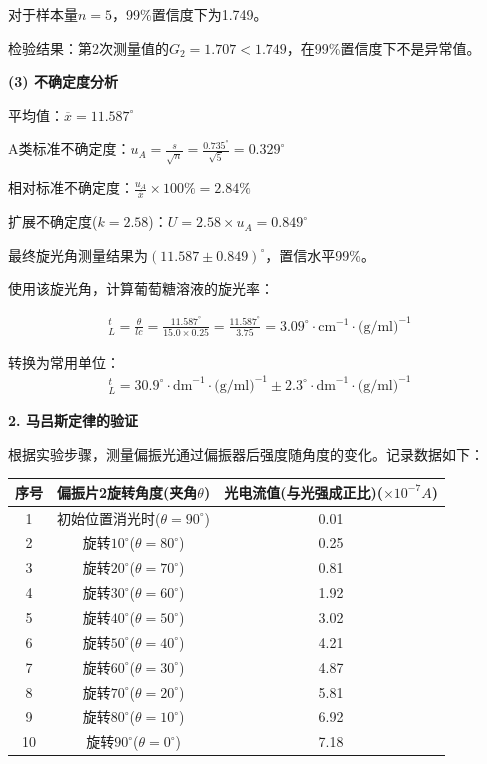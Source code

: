 ﻿\documentclass[12pt,a4paper]{article}
\begin{document}
对于样本量$n=5$，99\%置信度下为1.749。

检验结果：第2次测量值的$G_2 = 1.707 < 1.749$，在99\%置信度下不是异常值。

\textbf{(3) 不确定度分析}

平均值：$\overline{x} = 11.587^\circ$

A类标准不确定度：$u_A = \frac{s}{\sqrt{n}} = \frac{0.735^\circ}{\sqrt{5}} = 0.329^\circ$

相对标准不确定度：$\frac{u_A}{\overline{x}} \times 100\% = 2.84\%$

扩展不确定度($k=2.58$)：$U = 2.58 \times u_A = 0.849^\circ$

最终旋光角测量结果为$(11.587 \pm 0.849)^\circ$，置信水平99\%。

使用该旋光角，计算葡萄糖溶液的旋光率：

\begin{eqnarray}
    [\alpha]_L^t = \frac{\theta}{lc} = \frac{11.587^\circ}{15.0 \times 0.25} = \frac{11.587^\circ}{3.75} = 3.09^\circ \cdot \text{cm}^{-1} \cdot \text{(g/ml)}^{-1}
\end{eqnarray}

转换为常用单位：
\begin{eqnarray}
    [\alpha]_L^t = 30.9^\circ \cdot \text{dm}^{-1} \cdot \text{(g/ml)}^{-1} \pm 2.3^\circ \cdot \text{dm}^{-1} \cdot \text{(g/ml)}^{-1}
\end{eqnarray}

\vspace{0.5cm}

\textbf{2. 马吕斯定律的验证}

根据实验步骤，测量偏振光通过偏振器后强度随角度的变化。记录数据如下：
\begin{center}
    \begin{tabular}{ccc}
        \toprule
        序号 & 偏振片2旋转角度(夹角$\theta$) & 光电流值(与光强成正比)($\times 10^{-7}A$)\\
        \midrule
        1 & 初始位置消光时($\theta = 90^\circ$) & 0.01 \\
        2 & 旋转$10^\circ$($\theta = 80^\circ$) & 0.25 \\
        3 & 旋转$20^\circ$($\theta = 70^\circ$) & 0.81 \\
        4 & 旋转$30^\circ$($\theta = 60^\circ$) & 1.92 \\
        5 & 旋转$40^\circ$($\theta = 50^\circ$) & 3.02 \\
        6 & 旋转$50^\circ$($\theta = 40^\circ$) & 4.21 \\
        7 & 旋转$60^\circ$($\theta = 30^\circ$) & 4.87 \\
        8 & 旋转$70^\circ$($\theta = 20^\circ$) & 5.81 \\
        9 & 旋转$80^\circ$($\theta = 10^\circ$) & 6.92 \\
        10 & 旋转$90^\circ$($\theta = 0^\circ$) & 7.18 \\
        \bottomrule
    \end{tabular}
\end{center}
\end{document}
